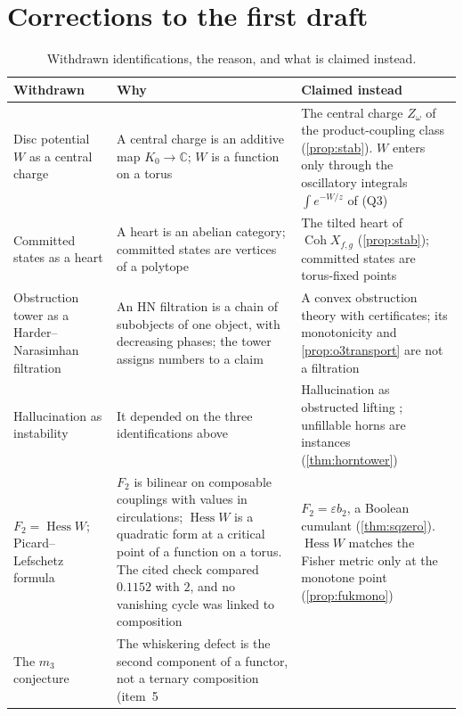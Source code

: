 \documentclass[11pt]{article}
\theoremstyle{definition}
\theoremstyle{remark}
\begin{document}
\appendix
\section{Corrections to the first draft}\label{sec:corrections}

\begin{table}[ht]
\centering\small
\caption{Withdrawn identifications, the reason, and what is claimed instead.}\label{tab:withdrawn}
\begin{tabular}{@{}R{0.2\textwidth}R{0.36\textwidth}R{0.38\textwidth}@{}}
\toprule
Withdrawn & Why & Claimed instead\\
\midrule
Disc potential $W$ as a central charge & A central charge is an additive map $K_0\to\mathbb C$; $W$ is a function on a torus &
The central charge $Z_\omega$ of the product-coupling class (\cref{prop:stab}). $W$ enters only through the oscillatory
integrals $\int e^{-W/z}$ of (Q3)\\\addlinespace[3pt]
Committed states as a heart & A heart is an abelian category; committed states are vertices of a polytope &
The tilted heart of $\operatorname{Coh}X_{f,g}$ (\cref{prop:stab}); committed states are torus-fixed points\\\addlinespace[3pt]
Obstruction tower as a Harder--Narasimhan filtration & An HN filtration is a chain of subobjects of one object, with
decreasing phases; the tower assigns numbers to a claim & A convex obstruction theory with certificates; its
monotonicity \cite[Thm.~10.5]{Awasthi-Tower} and \cref{prop:o3transport} are not a filtration\\\addlinespace[3pt]
Hallucination as instability & It depended on the three identifications above & Hallucination as obstructed lifting
\cite[Def.~10.17]{Awasthi-Tower}; unfillable horns are instances (\cref{thm:horntower})\\\addlinespace[3pt]
$F_2=\operatorname{Hess}W$; Picard--Lefschetz formula & $F_2$ is bilinear on composable couplings with values in
circulations; $\operatorname{Hess}W$ is a quadratic form at a critical point of a function on a torus. The cited check
compared $0.1152$ with $2$, and no vanishing cycle was linked to composition & $F_2=\varepsilon b_2$, a Boolean cumulant
(\cref{thm:sqzero}). $\operatorname{Hess}W$ matches the Fisher metric only at the monotone point
(\cref{prop:fukmono})\\\addlinespace[3pt]
The $m_3$ conjecture & The whiskering defect is the second component of a functor, not a ternary composition (item~5

\end{tabular}
\end{table}
\end{document}
